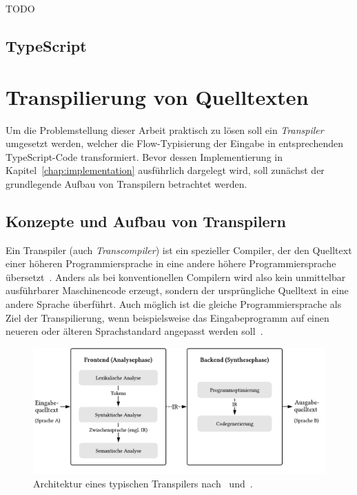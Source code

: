 TODO

\bigbreak


\subsection{TypeScript}

\section{Transpilierung von Quelltexten}
\label{sec:transpilers}

Um die Problemstellung dieser Arbeit praktisch zu lösen soll ein \textit{Transpiler} umgesetzt werden, welcher die Flow-Typisierung der Eingabe in entsprechenden TypeScript-Code transformiert. Bevor dessen Implementierung in Kapitel~\ref{chap:implementation} ausführlich dargelegt wird, soll zunächst der grundlegende Aufbau von Transpilern betrachtet werden.

\subsection{Konzepte und Aufbau von Transpilern}

Ein Transpiler (auch \textit{Transcompiler}) ist ein spezieller Compiler, der den Quelltext einer höheren Programmiersprache in eine andere höhere Programmiersprache übersetzt~\autocite[3]{AHO:COMPILERS}. Anders als bei konventionellen Compilern wird also kein unmittelbar ausführbarer Maschinencode erzeugt, sondern der ursprüngliche Quelltext in eine andere Sprache überführt. Auch möglich ist die gleiche Programmiersprache als Ziel der Transpilierung, wenn beispielsweise das Eingabeprogramm auf einen neueren oder älteren Sprachstandard angepasst werden soll~\autocite{EVGENIY:2016}.

\begin{figure}[htb]
  \includegraphics[width=\textwidth]{src/2_Grundlagen/fig/transpiler-architecture.pdf}
  \caption{Architektur eines typischen Transpilers nach~\autocite{EVGENIY:2016} und~\autocite[8]{TORCZON:2007}.}
	\label{fig:transpiler-architecture}
\end{figure}

